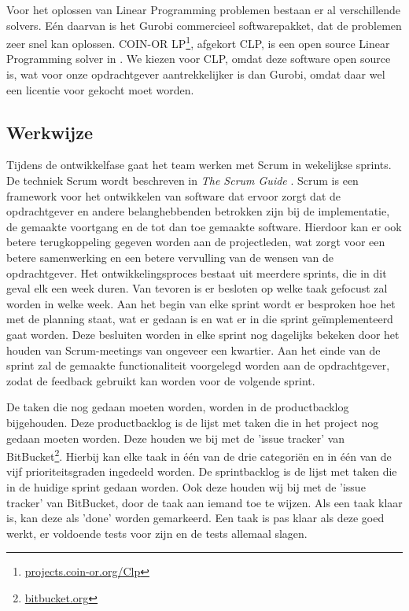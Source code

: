 Voor het oplossen van Linear Programming problemen bestaan er al verschillende solvers. E\'en daarvan is het Gurobi commercieel softwarepakket, dat de problemen zeer snel kan oplossen. COIN-OR LP\footnote{\href{http://projects.coin-or.org/Clp}{projects.coin-or.org/Clp}}, afgekort CLP, is een open source Linear Programming solver in \cpp . We kiezen voor CLP, omdat deze software open source is, wat voor onze opdrachtgever aantrekkelijker is dan Gurobi, omdat daar wel een licentie voor gekocht moet worden.

\subsection{Werkwijze}
Tijdens de ontwikkelfase gaat het team werken met Scrum in wekelijkse sprints. De techniek Scrum wordt beschreven in \emph{The Scrum Guide} \cite{schwaber2011}. Scrum is een framework voor het ontwikkelen van software dat ervoor zorgt dat de opdrachtgever en andere belanghebbenden betrokken zijn bij de implementatie, de gemaakte voortgang en de tot dan toe gemaakte software. Hierdoor kan er ook betere terugkoppeling gegeven worden aan de projectleden, wat zorgt voor een betere samenwerking en een betere vervulling van de wensen van de opdrachtgever. Het ontwikkelingsproces bestaat uit meerdere sprints, die in dit geval elk een week duren. Van tevoren is er besloten op welke taak gefocust zal worden in welke week. Aan het begin van elke sprint wordt er besproken hoe het met de planning staat, wat er gedaan is en wat er in die sprint ge\"implementeerd gaat worden. Deze besluiten worden in elke sprint nog dagelijks bekeken door het houden van Scrum-meetings van ongeveer een kwartier. Aan het einde van de sprint zal de gemaakte functionaliteit voorgelegd worden aan de opdrachtgever, zodat de feedback gebruikt kan worden voor de volgende sprint. 

De taken die nog gedaan moeten worden, worden in de productbacklog bijgehouden. Deze productbacklog is de lijst met taken die in het project nog gedaan moeten worden. Deze houden we bij met de 'issue tracker' van BitBucket\footnote{\href{http://bitbucket.org}{bitbucket.org}}. Hierbij kan elke taak in \'e\'en van de drie categori\"en en in \'e\'en van de vijf prioriteitsgraden ingedeeld worden. De sprintbacklog is de lijst met taken die in de huidige sprint gedaan worden. Ook deze houden wij bij met de 'issue tracker' van BitBucket, door de taak aan iemand toe te wijzen. Als een taak klaar is, kan deze als 'done' worden gemarkeerd. Een taak is pas klaar als deze goed werkt, er voldoende tests voor zijn en de tests allemaal slagen.

